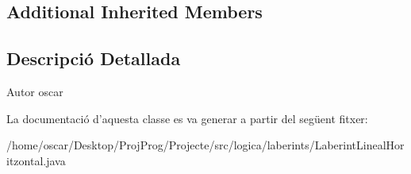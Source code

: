 \subsection*{Additional Inherited Members}


\subsection{Descripció Detallada}
\begin{DoxyAuthor}{Autor}
oscar 
\end{DoxyAuthor}


La documentació d'aquesta classe es va generar a partir del següent fitxer\+:\begin{DoxyCompactItemize}
\item 
/home/oscar/\+Desktop/\+Proj\+Prog/\+Projecte/src/logica/laberints/Laberint\+Lineal\+Horitzontal.\+java\end{DoxyCompactItemize}
